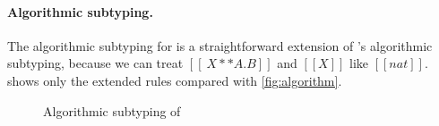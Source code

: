 \paragraph{Algorithmic subtyping.}

The algorithmic subtyping for \fnamee is a straightforward extension of \namee's
algorithmic subtyping, because we can treat $[[ \ X ** A . B ]]$ and $[[X]]$
like $[[nat]]$.  shows only the extended rules compared
with \cref{fig:algorithm}.

\begin{figure}
  \centering
  \caption{Algorithmic subtyping of \fnamee}
  \label{fig:algo:sub:fi}
\end{figure}

